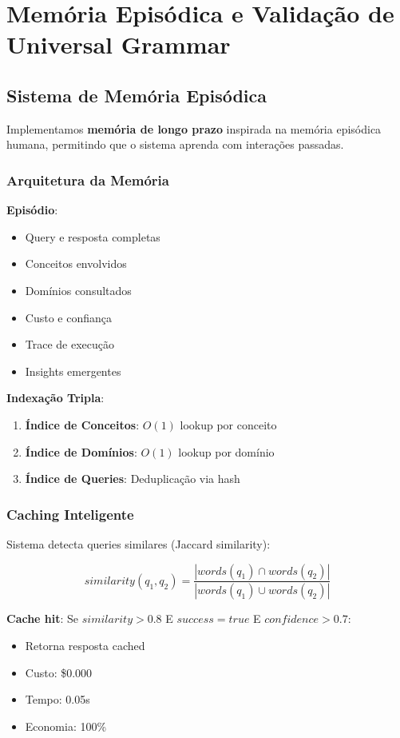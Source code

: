 \documentclass[11pt]{article}
\begin{document}
\section{Memória Episódica e Validação de Universal Grammar}

\subsection{Sistema de Memória Episódica}

Implementamos \textbf{memória de longo prazo} inspirada na memória episódica humana, permitindo que o sistema aprenda com interações passadas.

\subsubsection{Arquitetura da Memória}

\textbf{Episódio}:
\begin{itemize}
    \item Query e resposta completas
    \item Conceitos envolvidos
    \item Domínios consultados
    \item Custo e confiança
    \item Trace de execução
    \item Insights emergentes
\end{itemize}

\textbf{Indexação Tripla}:
\begin{enumerate}
    \item \textbf{Índice de Conceitos}: $O(1)$ lookup por conceito
    \item \textbf{Índice de Domínios}: $O(1)$ lookup por domínio
    \item \textbf{Índice de Queries}: Deduplicação via hash
\end{enumerate}

\subsubsection{Caching Inteligente}

Sistema detecta queries similares (Jaccard similarity):

\begin{equation}
similarity(q_1, q_2) = \frac{|words(q_1) \cap words(q_2)|}{|words(q_1) \cup words(q_2)|}
\end{equation}

\textbf{Cache hit}: Se $similarity > 0.8$ E $success = true$ E $confidence > 0.7$:
\begin{itemize}
    \item Retorna resposta cached
    \item Custo: \$0.000
    \item Tempo: 0.05s
    \item Economia: 100\%
\end{itemize}
\end{document}
